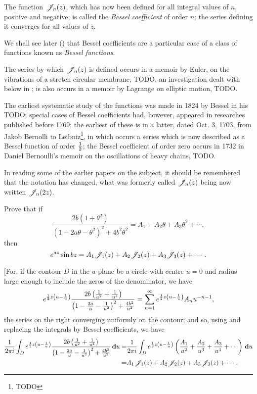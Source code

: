 The function $\mathscr{J}_{n}(z)$, which has now been defined for all integral
values of $n$, positive and negative, is called the
\emph{Bessel coefficient} of order $n$; the series defining it 
converges for all values of $z$.

We shall see later () that Bessel
coefficients are a particular case of a class of functions known as
\emph{Bessel functions}.

The series by which $\mathscr{J}_{n}(z)$ is defined occurs in a memoir by Euler,
on the vibrations of a stretch circular membrane, TODO, 
an investigation dealt with below in ;
is also occurs in a memoir by Lagrange on elliptic motion, TODO.

The earliest systematic study of the functions was made in 1824 by
Bessel in his TODO; special cases of Bessel coefficients had, however,
appeared in researches published before 1769; the earliest of these is
in a latter, dated Oct. 3, 1703, from Jakob Bernolli to
Leibniz\footnote{TODO}, in which occurs a series which is now
described as a Bessel function of order $\frac{1}{2}$; the Bessel
coefficient of order zero occurs in 1732 in Daniel Bernoulli's memoir
on the oscillations of heavy chains, TODO.

In reading some of the earlier papers on the subject, it should be
remembered that the notation has changed, what was formerly called
$\mathscr{J}_{n}(z)$ being now written $\mathscr{J}_{n}(2z)$.
\begin{wandwexample}
  Prove that if 
  $$
  \frac{ 2b(1+\theta^{2})  }{ (1-2a\theta-\theta^{2})^{2} + 4b^{2}\theta^{2}  }
  =
  A_{1} + A_{2} \theta + A_{3} \theta^{2} + \cdots,
  $$
  then
  $$
  e^{az} \sin bz 
  =
  A_{1} \mathscr{J}_{1}(z) + A_{2} \mathscr{J}_{2}(z) + A_{3} \mathscr{J}_{3}(z) + \cdots.
  $$
\end{wandwexample}

[For, if the contour $D$ in the $u$-plane be a circle with centre
$u=0$ and radius large enough to include the zeros of the denominator,
we have
$$
e^{\frac{1}{2} z \left( u - \frac{1}{u} \right)} 
\frac{ 2b \left( \frac{1}{u^{2}} + \frac{1}{u^{4}}  \right)  }{ \left( 1 -
    \frac{2a}{u} - \frac{1}{u^{2}} \right)^{2}
  + \frac{4 b^{2}}{u^{2}}  }
=
\sum_{n=1}^{\infty}
e^{\frac{1}{2} z \left( u - \frac{1}{u} \right)} A_{n} u^{-n-1},
$$
the series on the right converging uniformly on the contour; and so, 
using  and replacing the integrals by Bessel
coefficients, we have
\begin{align*}
  \frac{1}{2\pi i}
  \int_{D}
  e^{\half z \theparen{u - \frac{1}{u}}}
  \frac{ 2b \theparen{\frac{1}{u^{2}} + \frac{1}{u^{4}} }  }{ \theparen{1 -
      \frac{2a}{u} - \frac{1}{u^{2}}}^{2}
    + \frac{4 b^{2}}{u^{2}}  }
  \dmeasure u
  =& \frac{1}{2\pi i}
  \int_{D}
  e^{\half z \theparen{u - \frac{1}{u}}}
  \theparen{ \frac{A_{1}}{u^{2}} + \frac{A_{2}}{u^{3}} + \frac{A_{3}}{u^{4}} +
    \cdots  }
  \dmeasure u \\
  =& A_{1} \besJ_{1}(z) + A_{2} \besJ_{2}(z) + A_{3} \besJ_{3}(z) + \cdots .
\end{align*}

